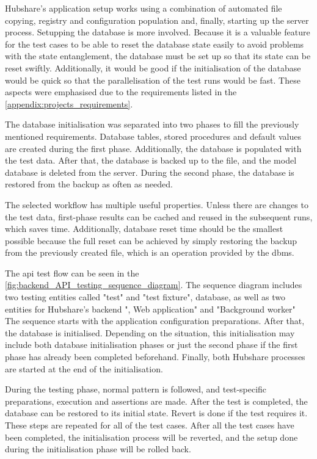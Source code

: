 Hubshare's application setup works using a combination of automated file copying, registry and configuration population and, finally, starting up the server process. Setupping the database is more involved. Because it is a valuable feature for the test cases to be able to reset the database state easily to avoid problems with the state entanglement, the database must be set up so that its state can be reset swiftly. Additionally, it would be good if the initialisation of the database would be quick so that the parallelisation of the test runs would be fast. These aspects were emphasised due to the requirements listed in the \autoref{appendix:projects_requirements}.

The database initialisation was separated into two phases to fill the previously mentioned requirements. Database tables, stored procedures and default values are created during the first phase. Additionally, the database is populated with the test data. After that, the database is backed up to the file, and the model database is deleted from the server. During the second phase, the database is restored from the backup as often as needed.

The selected workflow has multiple useful properties. Unless there are changes to the test data, first-phase results can be cached and reused in the subsequent runs, which saves time. Additionally, database reset time should be the smallest possible because the full reset can be achieved by simply restoring the backup from the previously created file, which is an operation provided by the \gls{dbms}.

The \gls{api} test flow can be seen in the \autoref{fig:backend_API_testing_sequence_diagram}. The sequence diagram includes two testing entities called "test" and "test fixture", database, as well as two entities for Hubshare's backend ", Web application" and "Background worker" The sequence starts with the application configuration preparations. After that, the database is initialised. Depending on the situation, this initialisation may include both database initialisation phases or just the second phase if the first phase has already been completed beforehand. Finally, both Hubshare processes are started at the end of the initialisation.

During the testing phase, normal  pattern is followed, and test-specific preparations, execution and assertions are made. After the test is completed, the database can be restored to its initial state. Revert is done if the test requires it. These steps are repeated for all of the test cases. After all the test cases have been completed, the initialisation process will be reverted, and the setup done during the initialisation phase will be rolled back.

